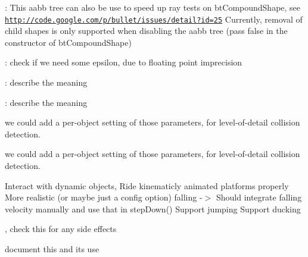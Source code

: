\begin{DoxyRefList}
\+: This aabb tree can also be use to speed up ray tests on bt\+Compound\+Shape, see \href{http://code.google.com/p/bullet/issues/detail?id=25}{\tt http\+://code.\+google.\+com/p/bullet/issues/detail?id=25} Currently, removal of child shapes is only supported when disabling the aabb tree (pass \textquotesingle{}false\textquotesingle{} in the constructor of bt\+Compound\+Shape)  
\item[\label{todo__todo000014}%
\Hypertarget{todo__todo000014}%
Member \hyperlink{structbtConnectivityProcessor_a5d5f11a5ad2bc3b3bfad6882b42e18de}{bt\+Connectivity\+Processor\+:\+:process\+Triangle} (bt\+Vector3 $\ast$triangle, int part\+Id, int triangle\+Index)]\+: check if we need some epsilon, due to floating point imprecision  
\item[\label{todo__todo000012}%
\Hypertarget{todo__todo000012}%
Class \hyperlink{classbtDefaultCollisionConfiguration}{bt\+Default\+Collision\+Configuration} ]\+: describe the meaning 

\+: describe the meaning  
\item[\label{todo__todo000013}%
\Hypertarget{todo__todo000013}%
Member \hyperlink{classbtDefaultCollisionConfiguration_a39a173eedf0e8d55dd89ef3b637925a9}{bt\+Default\+Collision\+Configuration\+:\+:set\+Convex\+Convex\+Multipoint\+Iterations} (int num\+Perturbation\+Iterations=3, int minimum\+Points\+Perturbation\+Threshold=3)]we could add a per-\/object setting of those parameters, for level-\/of-\/detail collision detection. 

we could add a per-\/object setting of those parameters, for level-\/of-\/detail collision detection.  
\item[\label{todo__todo000027}%
\Hypertarget{todo__todo000027}%
Class \hyperlink{classbtKinematicClosestNotMeRayResultCallback}{bt\+Kinematic\+Closest\+Not\+Me\+Ray\+Result\+Callback} ]Interact with dynamic objects, Ride kinematicly animated platforms properly More realistic (or maybe just a config option) falling -\/$>$ Should integrate falling velocity manually and use that in step\+Down() Support jumping Support ducking  
\item[\label{todo__todo000015}%
\Hypertarget{todo__todo000015}%
Member \hyperlink{classbtManifoldResult_aebe32f0c202d988d0458e88d768602c6}{bt\+Manifold\+Result\+:\+:add\+Contact\+Point} (const bt\+Vector3 \&normal\+On\+B\+In\+World, const bt\+Vector3 \&point\+In\+World, bt\+Scalar depth)], check this for any side effects  
\item[\label{todo__todo000040}%
\Hypertarget{todo__todo000040}%
Member \hyperlink{classbtQuaternion_a4c5ce0652f1cff12d1981c49b43483f1}{bt\+Quaternion\+:\+:farthest} (const \hyperlink{classbtQuaternion}{bt\+Quaternion} \&qd) const]document this and it\textquotesingle{}s use 


\end{DoxyRefList}
